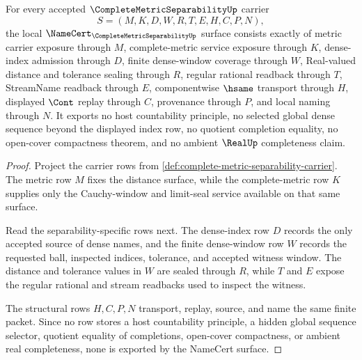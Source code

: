 \begin{theorem}
\label{thm:complete-metric-separability-namecert-obligations}
For every accepted $\CompleteMetricSeparabilityUp$ carrier
$$
S=(M,K,D,W,R,T,E,H,C,P,N),
$$
the local $\NameCert_{\CompleteMetricSeparabilityUp}$ surface consists exactly of metric carrier exposure through $M$, complete-metric service exposure through $K$, dense-index admission through $D$, finite dense-window coverage through $W$, Real-valued distance and tolerance sealing through $R$, regular rational readback through $T$, StreamName readback through $E$, componentwise $\hsame$ transport through $H$, displayed $\Cont$ replay through $C$, provenance through $P$, and local naming through $N$. It exports no host countability principle, no selected global dense sequence beyond the displayed index row, no quotient completion equality, no open-cover compactness theorem, and no ambient $\RealUp$ completeness claim.
\end{theorem}
\begin{proof}
Project the carrier rows from \autoref{def:complete-metric-separability-carrier}. The metric row $M$ fixes the distance surface, while the complete-metric row $K$ supplies only the Cauchy-window and limit-seal service available on that same surface.

Read the separability-specific rows next. The dense-index row $D$ records the only accepted source of dense names, and the finite dense-window row $W$ records the requested ball, inspected indices, tolerance, and accepted witness window. The distance and tolerance values in $W$ are sealed through $R$, while $T$ and $E$ expose the regular rational and stream readbacks used to inspect the witness.

The structural rows $H,C,P,N$ transport, replay, source, and name the same finite packet. Since no row stores a host countability principle, a hidden global sequence selector, quotient equality of completions, open-cover compactness, or ambient real completeness, none is exported by the NameCert surface.
\end{proof}


